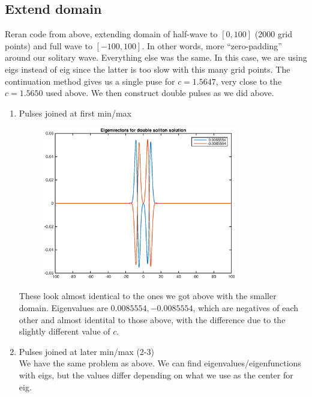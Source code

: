 \documentclass[12pt]{article}
\begin{document}
\subsection*{Extend domain}
Reran code from above, extending domain of half-wave to $[0,100]$ (2000 grid points) and full wave to $[-100, 100]$. In other words, more ``zero-padding'' around our solitary wave. Everything else was the same. In this case, we are using \textrm{eigs} instead of \textrm{eig} since the latter is too slow with this many grid points. The continuation method gives us a single puse for $c = 1.5647$, very close to the $c = 1.5650$ used above. We then construct double pulses as we did above.
\begin{enumerate}
	\item Pulses joined at first min/max
	\begin{figure}[H]
	\includegraphics[width=8.5cm]{double1vec_100.eps}
	\end{figure}
	These look almost identical to the ones we got above with the smaller domain. Eigenvalues are $0.0085554, -0.0085554$, which are negatives of each other and almost identital to those above, with the difference due to the slightly different value of $c$.

	\item Pulses joined at later min/max (2-3)\\
	We have the same problem as above. We can find eigenvalues/eigenfunctions with \textrm{eigs}, but the values differ depending on what we use as the center for \textrm{eig}.
	
\end{enumerate}
\end{document}
